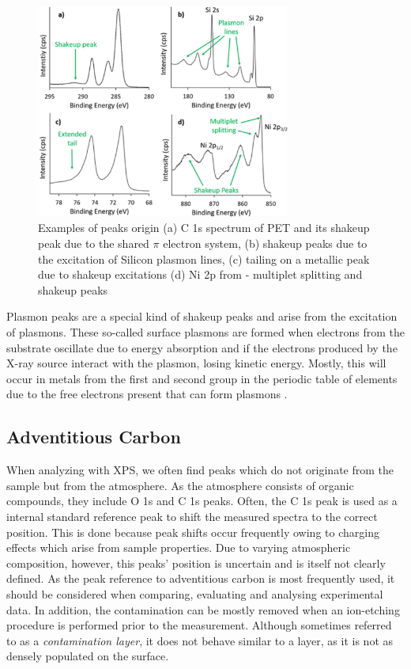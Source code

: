\begin{figure}[H]
    \centering
    \includegraphics[width=0.75\textwidth]{Figures/peaks.png}
    \caption{Examples of peaks origin (a) C 1s spectrum of PET and its shakeup peak due to the shared $\pi$ electron system, (b) shakeup peaks due to the excitation of Silicon plasmon lines, (c) tailing on a metallic peak due to shakeup excitations (d) Ni 2p from  - multiplet splitting and shakeup peaks \cite{stevie_introduction_2020}}
    \label{fig:peaks}
\end{figure}


Plasmon peaks are a special kind of shakeup peaks and arise from the excitation of plasmons. These so-called surface plasmons are formed when electrons from the substrate oscillate due to energy absorption and if the electrons produced by the X-ray source interact with the plasmon, losing kinetic energy. Mostly, this will occur in metals from the first and second group in the periodic table of elements due to the free electrons present that can form plasmons \cite{moulder_handbook_1992}.



\subsection{Adventitious Carbon}
    
When analyzing with XPS, we often find peaks which do not originate from the sample but from the atmosphere. As the atmosphere consists of organic compounds, they include O 1s and C 1s peaks. Often, the C 1s peak is used as a internal standard reference peak to shift the measured spectra to the correct position. This is done because peak shifts occur frequently owing to charging effects which arise from sample properties. Due to varying atmospheric composition, however, this peaks' position is uncertain and is itself  not clearly defined. \cite{biesinger_accessing_2022} As the peak reference to adventitious carbon is most frequently used, it should be considered when comparing, evaluating and analysing experimental data.
In addition, the contamination can be mostly removed when an ion-etching procedure is performed prior to the measurement. Although sometimes referred to as a \emph{contamination layer}, it does not behave similar to a layer, as it is not as densely populated on the surface.

